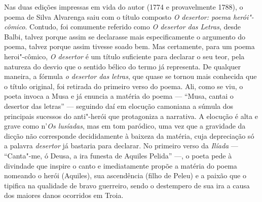 Nas duas edições impressas em vida do autor (1774 e provavelmente 1788), o poema
de Silva Alvarenga saiu com o título composto \textit{O desertor: poema
herói"-cômico}. Contudo, foi comumente referido como \textit{O desertor das
Letras}, desde Balbi, talvez porque assim se declarasse mais especificamente o
argumento do poema, talvez porque assim tivesse soado bem. Mas certamente, para
um poema heroi"-cômico, \textit{O desertor} é um título suficiente para declarar o
seu teor, pela natureza do desvio que o sentido bélico do termo já representa.
De qualquer maneira, a fórmula \textit{o desertor das letras}, que quase se
tornou mais conhecida que o título original, foi retirada do primeiro verso do
poema. Ali, como se viu, o poeta invoca a Musa e já enuncia a matéria do poema
--- ``Musa, cantai o desertor das letras'' --- seguindo daí em elocução camoniana
a súmula dos principais sucessos do anti"-herói que protagoniza a narrativa.  A
elocução é alta e grave como n'\textit{Os lusíadas}, mas em tom paródico, uma
vez que a gravidade da dicção não corresponde decididamente à baixeza da
matéria, cuja depreciação só a palavra \textit{desertor} já bastaria para
declarar. No primeiro verso da \textit{Ilíada} --- ``Canta"-me, ó Deusa, a ira
funesta de Aquiles Pelida'' ---, o poeta pede à divindade que inspire o canto e
imediatamente propõe a matéria do poema nomeando o herói (Aquiles), sua
ascendência (filho de Peleu) e a paixão que o tipifica na qualidade de bravo
guerreiro, sendo o destempero de sua ira a causa dos maiores danos ocorridos em
Troia.

